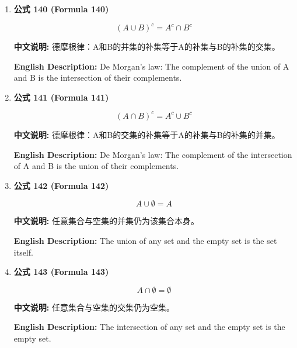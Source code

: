 \documentclass[12pt,a4paper]{article}
\begin{document}
\begin{enumerate}[leftmargin=*]
\vspace{0.5cm}

\item \textbf{公式 140 (Formula 140)}

\begin{equation}
(A \cup B)^c = A^c \cap B^c
\end{equation}

\textbf{中文说明:} 德摩根律：A和B的并集的补集等于A的补集与B的补集的交集。

\textbf{English Description:} De Morgan's law: The complement of the union of A and B is the intersection of their complements.

\vspace{0.5cm}

\item \textbf{公式 141 (Formula 141)}

\begin{equation}
(A \cap B)^c = A^c \cup B^c
\end{equation}

\textbf{中文说明:} 德摩根律：A和B的交集的补集等于A的补集与B的补集的并集。

\textbf{English Description:} De Morgan's law: The complement of the intersection of A and B is the union of their complements.

\vspace{0.5cm}

\item \textbf{公式 142 (Formula 142)}

\begin{equation}
A \cup \emptyset = A
\end{equation}

\textbf{中文说明:} 任意集合与空集的并集仍为该集合本身。

\textbf{English Description:} The union of any set and the empty set is the set itself.

\vspace{0.5cm}

\item \textbf{公式 143 (Formula 143)}

\begin{equation}
A \cap \emptyset = \emptyset
\end{equation}

\textbf{中文说明:} 任意集合与空集的交集仍为空集。

\textbf{English Description:} The intersection of any set and the empty set is the empty set.

\vspace{0.5cm}


\end{enumerate}
\end{document}
